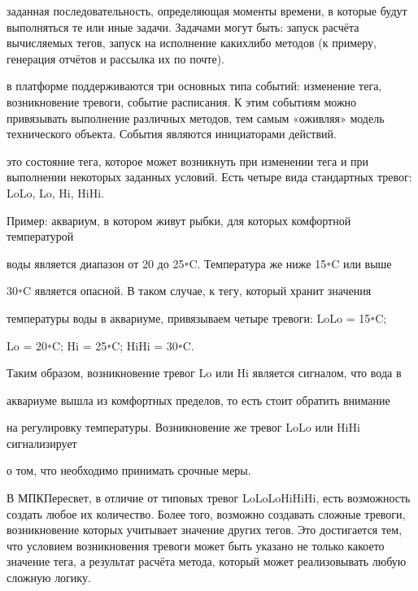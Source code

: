 \documentclass[a4paper,10pt,russian]{sphinxmanual}
\begin{document}
\sphinxAtStartPar
{} \sphinxhyphen{} заданная последовательность, определяющая моменты времени,
в которые будут выполняться те или иные задачи. Задачами могут быть: запуск
расчёта вычисляемых тегов, запуск на исполнение каких\sphinxhyphen{}либо методов (к примеру,
генерация отчётов и рассылка их по почте).

\sphinxAtStartPar
{} \sphinxhyphen{} в платформе поддерживаются три основных типа событий: изменение
тега, возникновение тревоги, событие расписания. К этим событиям можно
привязывать выполнение различных методов, тем самым «оживляя» модель
технического объекта. События являются инициаторами действий.

\sphinxAtStartPar
{} \sphinxhyphen{} это состояние тега, которое может возникнуть при изменении тега и
при выполнении некоторых заданных условий. Есть четыре вида стандартных тревог:
LoLo, Lo, Hi, HiHi.

\begin{DUlineblock}{0em}
\item[] Пример: аквариум, в котором живут рыбки, для которых комфортной температурой
\item[] воды является диапазон от 20 до 25࠾C. Температура же ниже 15࠾C или выше
\item[] 30࠾C является опасной. В таком случае, к тегу, который хранит значения
\item[] температуры воды в аквариуме, привязываем четыре тревоги: LoLo = 15࠾C;
\item[] Lo = 20࠾C; Hi = 25࠾C; HiHi = 30࠾C.
\item[] Таким образом, возникновение тревог Lo или Hi является сигналом, что вода в
\item[] аквариуме вышла из комфортных пределов, то есть стоит обратить внимание
\item[] на регулировку температуры. Возникновение же тревог LoLo или HiHi сигнализирует
\item[] о том, что необходимо принимать срочные меры.
\end{DUlineblock}

\sphinxAtStartPar
В МПК\sphinxhyphen{}Пересвет, в отличие от типовых тревог LoLo\sphinxhyphen{}Lo\sphinxhyphen{}Hi\sphinxhyphen{}HiHi, есть возможность
создать любое их количество. Более того, возможно создавать сложные тревоги,
возникновение которых учитывает значение других тегов. Это достигается тем,
что условием возникновения тревоги может быть указано не только какое\sphinxhyphen{}то
значение тега, а результат расчёта метода, который может реализовывать любую
сложную логику.
\end{document}
